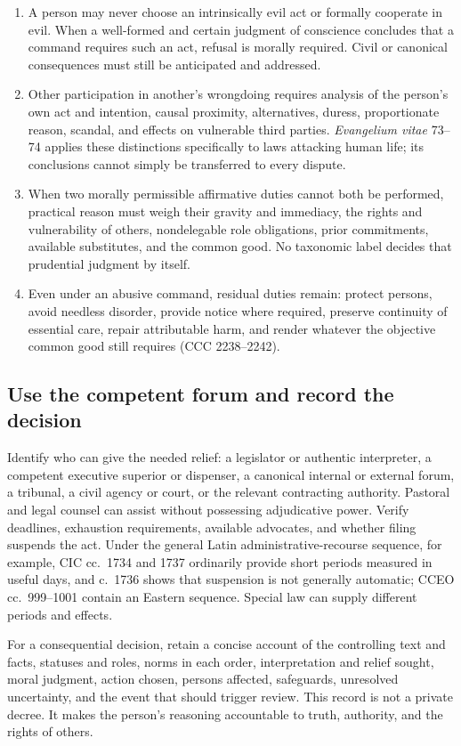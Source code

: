 \begin{enumerate}
\item A person may never choose an intrinsically evil act or formally cooperate in evil. When a well-formed and certain judgment of conscience concludes that a command requires such an act, refusal is morally required. Civil or canonical consequences must still be anticipated and addressed.
\item Other participation in another's wrongdoing requires analysis of the person's own act and intention, causal proximity, alternatives, duress, proportionate reason, scandal, and effects on vulnerable third parties. \emph{Evangelium vitae} 73--74 applies these distinctions specifically to laws attacking human life; its conclusions cannot simply be transferred to every dispute.
\item When two morally permissible affirmative duties cannot both be performed, practical reason must weigh their gravity and immediacy, the rights and vulnerability of others, nondelegable role obligations, prior commitments, available substitutes, and the common good. No taxonomic label decides that prudential judgment by itself.
\item Even under an abusive command, residual duties remain: protect persons, avoid needless disorder, provide notice where required, preserve continuity of essential care, repair attributable harm, and render whatever the objective common good still requires (CCC 2238--2242).
\end{enumerate}

\subsection{Use the competent forum and record the decision}

Identify who can give the needed relief: a legislator or authentic interpreter, a competent executive superior or dispenser, a canonical internal or external forum, a tribunal, a civil agency or court, or the relevant contracting authority. Pastoral and legal counsel can assist without possessing adjudicative power. Verify deadlines, exhaustion requirements, available advocates, and whether filing suspends the act. Under the general Latin administrative-recourse sequence, for example, CIC cc.~1734 and 1737 ordinarily provide short periods measured in useful days, and c.~1736 shows that suspension is not generally automatic; CCEO cc.~999--1001 contain an Eastern sequence. Special law can supply different periods and effects.

For a consequential decision, retain a concise account of the controlling text and facts, statuses and roles, norms in each order, interpretation and relief sought, moral judgment, action chosen, persons affected, safeguards, unresolved uncertainty, and the event that should trigger review. This record is not a private decree. It makes the person's reasoning accountable to truth, authority, and the rights of others.
